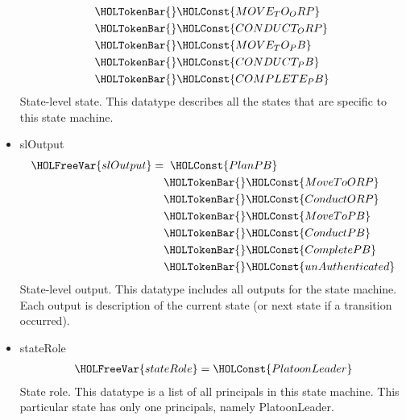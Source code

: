 \begin{itemize}
\begin{align*}
        &\HOLTokenBar{} \HOLConst{MOVE_TO_ORP}\ \\
        &\HOLTokenBar{} \HOLConst{CONDUCT_ORP}\ \\
        &\HOLTokenBar{} \HOLConst{MOVE_TO_PB}\ \\
        &\HOLTokenBar{} \HOLConst{CONDUCT_PB}\ \\
        &\HOLTokenBar{} \HOLConst{COMPLETE_PB}
      \end{align*}
State-level state. This datatype describes all the states that are specific to this state machine.
    \item slOutput
      \begin{align*}
        \HOLFreeVar{slOutput} =&\;\; \HOLConst{PlanPB}\ \\
        &\HOLTokenBar{} \HOLConst{MoveToORP}\ \\
        &\HOLTokenBar{} \HOLConst{ConductORP}\ \\
        &\HOLTokenBar{} \HOLConst{MoveToPB}\ \\
        &\HOLTokenBar{} \HOLConst{ConductPB}\ \\
        &\HOLTokenBar{} \HOLConst{CompletePB}\ \\
        &\HOLTokenBar{} \HOLConst{unAuthenticated}
      \end{align*}
      State-level output. This datatype includes all outputs for the state machine. Each
      output is description of the current state (or next state if a transition occurred).
    \item stateRole
      \begin{align*}
        \HOLFreeVar{stateRole} = \HOLConst{PlatoonLeader}
      \end{align*}
      State role. This datatype is a list of all principals in this state machine. This particular state has only one principals, namely PlatoonLeader.
  \end{itemize}



